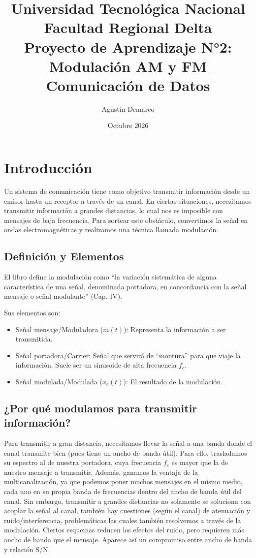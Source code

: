 \documentclass[11pt,a4paper]{article}
\title{%
  \large Universidad Tecnológica Nacional\\
  \large Facultad Regional Delta\\[3ex]
  \Huge Proyecto de Aprendizaje N°2: Modulación AM y FM\\[2ex]
  \large Comunicación de Datos%
}
\author{Agustín Demarco}
\date{Octubre 2026}
\numberwithin{equation}{section}
\begin{document}
\maketitle
\thispagestyle{empty}

\newpage
\tableofcontents

\newpage

\section{Introducción}
Un sistema de comunicación tiene como objetivo transmitir información desde un emisor hasta un receptor a través de un canal. En ciertas situaciones, necesitamos transmitir información a grandes distancias, lo cual nos es imposible con mensajes de baja frecuencia. Para sortear este obstáculo, convertimos la señal en ondas electromagnéticas y realizamos una técnica llamada modulación.

\subsection{Definición y Elementos}
El libro define la modulación como “la variación sistemática de alguna característica de una señal, denominada portadora, en concordancia con la señal mensaje o señal modulante” (Cap. IV).

Sus elementos son:
\begin{itemize}
  \item Señal mensaje/Moduladora ($m(t)$): Representa la información a ser transmitida.
  \item Señal portadora/Carrier: Señal que servirá de “montura” para que viaje la información. Suele ser un sinusoide de alta frecuencia $f_c$.
  \item Señal modulada/Modulada ($x_c(t)$): El resultado de la modulación.
\end{itemize}

\subsection{¿Por qué modulamos para transmitir información?}
Para transmitir a gran distancia, necesitamos llevar la señal a una banda donde el canal transmite bien (pues tiene un ancho de banda útil). Para ello, trasladamos su espectro al de nuestra portadora, cuya frecuencia $f_c$ es mayor que la de nuestro mensaje a transmitir. Además, ganamos la ventaja de la multicanalización, ya que podemos poner muchos mensajes en el mismo medio, cada uno en su propia banda de frecuencias dentro del ancho de banda útil del canal. Sin embargo, transmitir a grandes distancias no solamente se soluciona con acoplar la señal al canal, también hay cuestiones (según el canal) de atenuación y ruido/interferencia, problemáticas las cuales también resolvemos a través de la modulación. Ciertos esquemas reducen los efectos del ruido, pero requieren más ancho de banda que el mensaje. Aparece así un compromiso entre ancho de banda y relación S/N.
\end{document}
